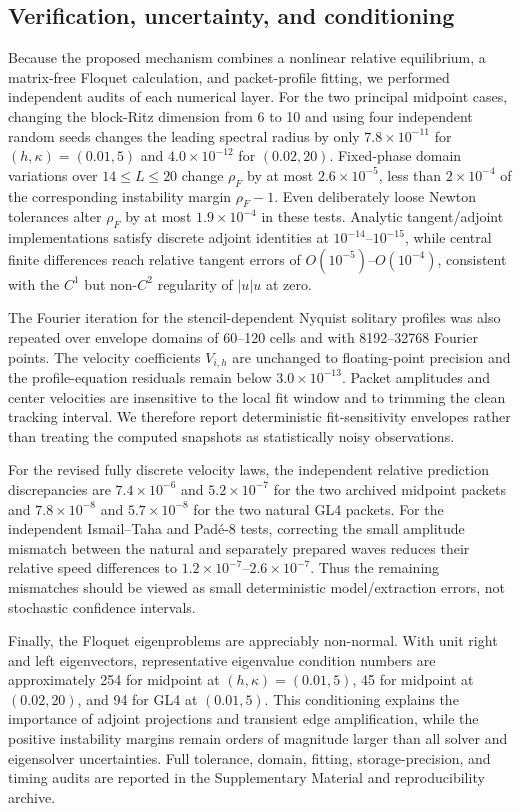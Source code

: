 \subsection{Verification, uncertainty, and conditioning}
\label{sec:verification}

Because the proposed mechanism combines a nonlinear relative equilibrium, a
matrix-free Floquet calculation, and packet-profile fitting, we performed
independent audits of each numerical layer.  For the two principal midpoint
cases, changing the block-Ritz dimension from 6 to 10 and using four independent
random seeds changes the leading spectral radius by only
$7.8\times10^{-11}$ for $(h,\kappa)=(0.01,5)$ and
$4.0\times10^{-12}$ for $(0.02,20)$.  Fixed-phase domain variations over
$14\le L\le20$ change $\rho_F$ by at most $2.6\times10^{-5}$, less than
$2\times10^{-4}$ of the corresponding instability margin $\rho_F-1$.
Even deliberately loose Newton tolerances alter $\rho_F$ by at most
$1.9\times10^{-4}$ in these tests.  Analytic tangent/adjoint implementations
satisfy discrete adjoint identities at $10^{-14}$--$10^{-15}$, while central
finite differences reach relative tangent errors of $O(10^{-5})$--$O(10^{-4})$,
consistent with the $C^1$ but non-$C^2$ regularity of $|u|u$ at zero.

The Fourier iteration for the stencil-dependent Nyquist solitary profiles was
also repeated over envelope domains of 60--120 cells and with 8192--32768
Fourier points.  The velocity coefficients $V_{i,h}$ are unchanged to
floating-point precision and the profile-equation residuals remain below
$3.0\times10^{-13}$.  Packet amplitudes and center velocities are insensitive
to the local fit window and to trimming the clean tracking interval.  We
therefore report deterministic fit-sensitivity envelopes rather than treating
the computed snapshots as statistically noisy observations.

For the revised fully discrete velocity laws, the independent relative
prediction discrepancies are $7.4\times10^{-6}$ and $5.2\times10^{-7}$ for
the two archived midpoint packets and $7.8\times10^{-8}$ and
$5.7\times10^{-8}$ for the two natural GL4 packets.  For the independent
Ismail--Taha and Pad\'e-8 tests, correcting the small amplitude mismatch between
the natural and separately prepared waves reduces their relative speed
differences to $1.2\times10^{-7}$--$2.6\times10^{-7}$.  Thus the remaining
mismatches should be viewed as small deterministic model/extraction errors,
not stochastic confidence intervals.

Finally, the Floquet eigenproblems are appreciably non-normal.  With unit
right and left eigenvectors, representative eigenvalue condition numbers are
approximately 254 for midpoint at $(h,\kappa)=(0.01,5)$, 45 for midpoint at
$(0.02,20)$, and 94 for GL4 at $(0.01,5)$.  This conditioning explains the
importance of adjoint projections and transient edge amplification, while the
positive instability margins remain orders of magnitude larger than all
solver and eigensolver uncertainties.  Full tolerance, domain, fitting,
storage-precision, and timing audits are reported in the Supplementary
Material and reproducibility archive.
